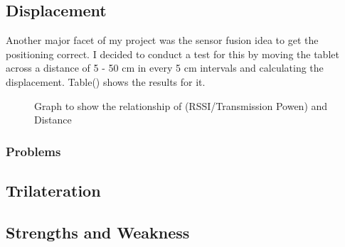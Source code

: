 \subsection{Displacement}
Another major facet of my project was the sensor fusion idea to get the positioning correct. I decided to conduct a test for this by moving the tablet across a distance of 5 - 50 cm in every 5 cm intervals and calculating the displacement. Table() shows the results for it.
\begin{figure}
\centering
{}
\caption{Graph to show the relationship of (RSSI/Transmission Powen) and Distance}
\label{fig:my_label}
\end{figure}

\subsubsection{Problems}

\subsection{Trilateration}

\subsection{Strengths and Weakness}
 